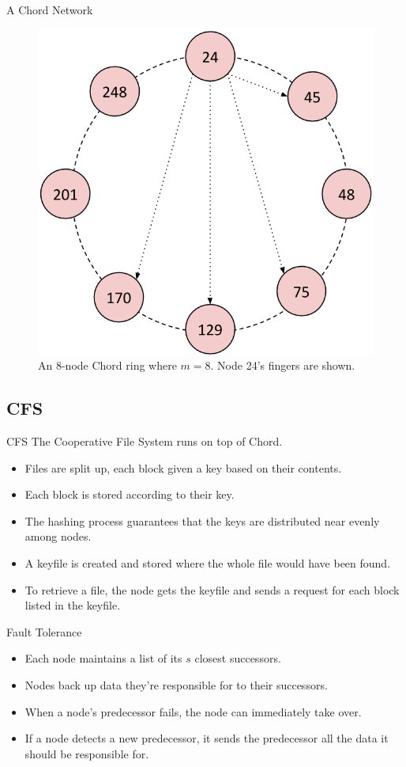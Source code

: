 \documentclass[11pt]{beamer}
\begin{document}
\begin{frame}{A Chord Network}
\begin{figure}
    \includegraphics[width=0.55\linewidth]{CR_overlay}
    \caption{An 8-node Chord ring where $m=8$.  Node 24's fingers are shown.}
    \label{chordreal}
\end{figure}
\end{frame}

\subsection{CFS}
\begin{frame}{CFS}
The Cooperative File System runs on top of Chord.

\begin{itemize}
	\item Files are split up, each block given a key based on their contents.
	\item Each block is stored according to their key.
	\item The hashing process guarantees that the keys are distributed near evenly among nodes.
	\item A keyfile is created and stored where the whole file would have been found.
	\item To retrieve a file, the node gets the keyfile and sends a request for each block listed in the keyfile.
\end{itemize}
\end{frame}
\begin{frame}{Fault Tolerance}

\begin{itemize}
	\item Each node maintains a list of its $s$ closest successors.
	\item Nodes back up data they're responsible for to their successors.
	\item When a node's predecessor fails, the node can immediately take over.
	\item If a node detects a new predecessor, it sends the predecessor all the data it should be responsible for.
\end{itemize}

\end{frame}
\end{document}
